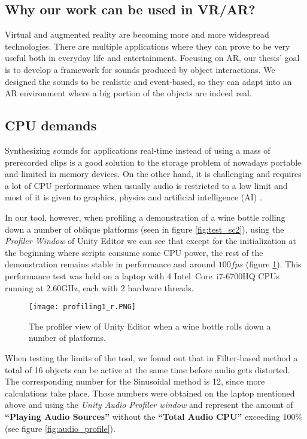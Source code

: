 \subsection{Why our work can be used in VR/AR?}
Virtual and augmented reality are becoming more and more widespread technologies. There are multiple applications where they can prove to be very useful both in everyday life and entertainment. Focusing on AR, our thesis' goal is to develop a framework for sounds produced by object interactions. We designed the sounds to be realistic and event-based, so they can adapt into an AR environment where a big portion of the objects are indeed real.


\subsection{CPU demands}
Synthesizing sounds for applications real-time instead of using a mass of prerecorded clips is a good solution to the storage problem of nowadays portable and limited in memory devices. On the other hand, it is challenging and requires a lot of CPU performance when usually audio is restricted to a low limit and most of it is given to graphics, physics and artificial intelligence (AI) \cite{lloyd2011sound}. 

In our tool, however, when profiling a demonstration of a wine bottle rolling down a number of oblique platforms (seen in figure \ref{fig:test_sc2}), using the \textit{Profiler Window} of Unity\textsuperscript{\textregistered} Editor we can see that except for the initialization at the beginning where scripts consume some CPU power, the rest of the demonstration remains stable in performance and around $100 fps$ (figure \ref{fig:profile}). This performance test was held on a laptop with 4 Intel\textregistered\ Core\texttrademark\ i7-6700HQ CPUs running at 2.60GHz, each with 2 hardware threads.

\begin{figure}[H]
  \centering
    \texttt{[image: profiling1\_r.PNG]}
      \caption{The profiler view of Unity\textsuperscript{\textregistered} Editor when a wine bottle rolls down a number of platforms.}
      \label{fig:profile}
\end{figure} 

When testing the limits of the tool, we found out that in Filter-based method a total of 16 objects can be active at the same time before audio gets distorted. The corresponding number for the Sinusoidal method is 12, since more calculations take place. Those numbers were obtained on the laptop mentioned above and using the \textit{Unity\textsuperscript{\textregistered} Audio Profiler window} and represent the amount of \textbf{``Playing Audio Sources''} without the \textbf{``Total Audio CPU''} exceeding $100\%$ (see figure \ref{fig:audio_profile}).

